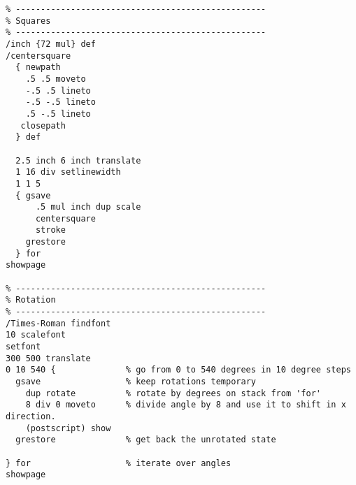 \fontsize{8pt}{10pt}
\begin{verbatim}
% --------------------------------------------------
% Squares
% --------------------------------------------------
/inch {72 mul} def
/centersquare
  { newpath
    .5 .5 moveto
    -.5 .5 lineto
    -.5 -.5 lineto
    .5 -.5 lineto
   closepath
  } def

  2.5 inch 6 inch translate
  1 16 div setlinewidth
  1 1 5 
  { gsave
      .5 mul inch dup scale
      centersquare
      stroke
    grestore
  } for
showpage

% --------------------------------------------------
% Rotation
% --------------------------------------------------
/Times-Roman findfont
10 scalefont
setfont
300 500 translate
0 10 540 {              % go from 0 to 540 degrees in 10 degree steps
  gsave                 % keep rotations temporary
    dup rotate          % rotate by degrees on stack from 'for'
    8 div 0 moveto      % divide angle by 8 and use it to shift in x direction.
    (postscript) show
  grestore              % get back the unrotated state

} for                   % iterate over angles
showpage
\end{verbatim}